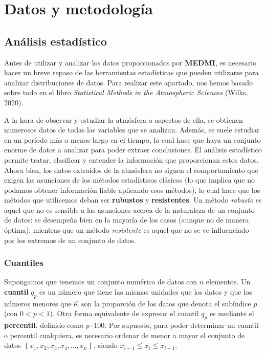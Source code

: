 \documentclass[12pt]{article}
\begin{document}
\newpage

\section{Datos y metodología}

\subsection{Análisis estadístico}

Antes de utilizar y analizar los datos proporcionados por \textbf{MEDMI}, es necesario hacer un breve repaso de las herramientas estadísticas que pueden utilizarse para analizar distribuciones de datos. Para realizar este apartado, nos hemos basado sobre todo en el libro \textit{Statistical Methods in the Atmospheric Sciences} (Wilks, 2020).

A la hora de observar y estudiar la atmósfera o aspectos de ella, se obtienen numerosos datos de todas las variables que se analizan. Además, se suele estudiar en un período más o menos largo en el tiempo, lo cual hace que haya un conjunto enorme de datos a analizar para poder extraer conclusiones. El análisis estadístico permite tratar, clasificar y entender la información que proporcionan estos datos. Ahora bien, los datos extraídos de la atmósfera no siguen el comportamiento que exigen las asunciones de los métodos estadísticos clásicos (lo que implica que no podamos obtener información fiable aplicando esos métodos), lo cual hace que los métodos que utilicemos deban ser \textbf{rubustos} y \textbf{resistentes}. Un método \textit{robusto} es aquel que no es sensible a las asunciones acerca de la naturaleza de un conjunto de datos: se desempeña bien en la mayoría de los casos (aunque no de manera óptima); mientras que un método \textit{resistente} es aquel que no se ve influenciado por los extremos de un conjunto de datos.

\subsubsection{Cuantiles}

Supongamos que tenemos un conjunto numérico de datos con $n$ elementos. Un \textbf{cuantil} $q_{p}$ es un número que tiene las mismas unidades que los datos y que los números menores que él son la proporción de los datos que denota el subíndice $p$ (con $0 < p < 1$). Otra forma equivalente de expresar el cuantil $q_{p}$ es mediante el \textbf{percentil}, definido como $p \cdot 100$. Por supuesto, para poder determinar un cuantil o percentil cualquiera, es necesario ordenar de menor a mayor el conjunto de datos  $\left\lbrace x_{1}, x_{2}, x_{3}, x_{4}, ..., x_{n} \right\rbrace$, siendo $ x_{i - 1} \leq x_{i} \leq x_{i + 1}$.
\end{document}
